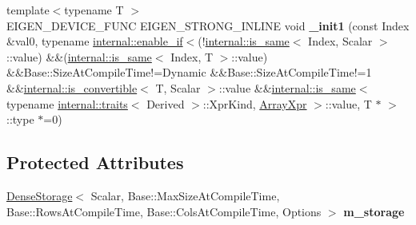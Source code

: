 \begin{DoxyCompactItemize}
\item 
\mbox{\label{class_eigen_1_1_plain_object_base_a69d076ea1b9fbf0ba501b41cbc43ae9f}} 
{\footnotesize template$<$typename T $>$ }\\E\+I\+G\+E\+N\+\_\+\+D\+E\+V\+I\+C\+E\+\_\+\+F\+U\+NC E\+I\+G\+E\+N\+\_\+\+S\+T\+R\+O\+N\+G\+\_\+\+I\+N\+L\+I\+NE void {\bfseries \+\_\+init1} (const Index \&val0, typename \mbox{\hyperlink{struct_eigen_1_1internal_1_1enable__if}{internal\+::enable\+\_\+if}}$<$(!\mbox{\hyperlink{struct_eigen_1_1internal_1_1is__same}{internal\+::is\+\_\+same}}$<$ Index, Scalar $>$\+::value) \&\&(\mbox{\hyperlink{struct_eigen_1_1internal_1_1is__same}{internal\+::is\+\_\+same}}$<$ Index, T $>$\+::value) \&\&Base\+::\+Size\+At\+Compile\+Time!=Dynamic \&\&Base\+::\+Size\+At\+Compile\+Time!=1 \&\&\mbox{\hyperlink{struct_eigen_1_1internal_1_1is__convertible}{internal\+::is\+\_\+convertible}}$<$ T, Scalar $>$\+::value \&\&\mbox{\hyperlink{struct_eigen_1_1internal_1_1is__same}{internal\+::is\+\_\+same}}$<$ typename \mbox{\hyperlink{struct_eigen_1_1internal_1_1traits}{internal\+::traits}}$<$ Derived $>$\+::Xpr\+Kind, \mbox{\hyperlink{struct_eigen_1_1_array_xpr}{Array\+Xpr}} $>$\+::value, T $\ast$ $>$\+::type $\ast$=0)
\end{DoxyCompactItemize}
\subsection*{Protected Attributes}
\begin{DoxyCompactItemize}
\item 
\mbox{\label{class_eigen_1_1_plain_object_base_a1f9b65493a9a3eb3375c3177a080a5e1}} 
\mbox{\hyperlink{class_eigen_1_1_dense_storage}{Dense\+Storage}}$<$ Scalar, Base\+::\+Max\+Size\+At\+Compile\+Time, Base\+::\+Rows\+At\+Compile\+Time, Base\+::\+Cols\+At\+Compile\+Time, Options $>$ {\bfseries m\+\_\+storage}
\end{DoxyCompactItemize}

